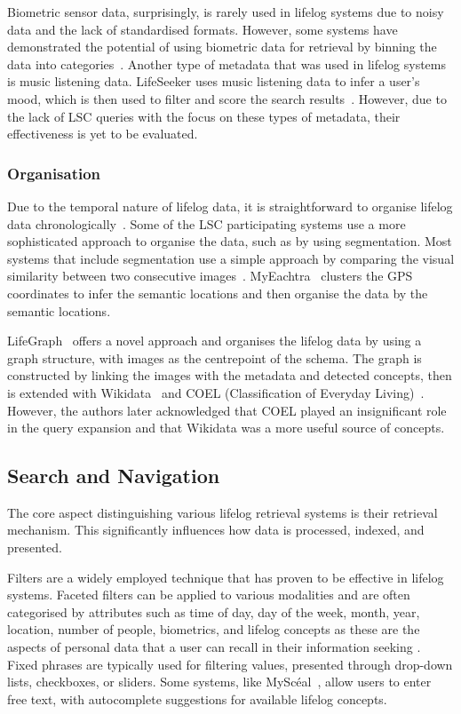 \documentclass[11pt]{article}
\newcommand{\mysceal}{MySc{\'e}al}
\begin{document}
Biometric sensor data, surprisingly, is rarely used in lifelog systems due to noisy data and the lack of standardised formats. However, some systems have demonstrated the potential of using biometric data for retrieval by binning the data into categories~\cite{tran_lifelog_2018,alsina2018interactive,nguyen2019two}. Another type of metadata that was used in lifelog systems is music listening data. LifeSeeker uses music listening data to infer a user's mood, which is then used to filter and score the search results~\cite{nguyen2023lifeseeker}. However, due to the lack of LSC queries with the focus on these types of metadata, their effectiveness is yet to be evaluated.

\subsubsection{Organisation}
Due to the temporal nature of lifelog data, it is straightforward to organise lifelog data chronologically~\cite{zhou_baseline_2017}. Some of the LSC participating systems use a more sophisticated approach to organise the data, such as by using segmentation. Most systems that include segmentation use a simple approach by comparing the visual similarity between two consecutive images~\cite{emysceal2022}. MyEachtra~\cite{tran2023myeachtra} clusters the GPS coordinates to infer the semantic locations and then organise the data by the semantic locations.

LifeGraph~\cite{rossetto2023multi} offers a novel approach and organises the lifelog data by using a graph structure, with images as the centrepoint of the schema. The graph is constructed by linking the images with the metadata and detected concepts, then is extended with Wikidata~\cite{vrandevcic2014wikidata} and COEL (Classification of Everyday Living)~\cite{bruton2019classification}. However, the authors later acknowledged that COEL played an insignificant role in the query expansion and that Wikidata was a more useful source of concepts.

\subsection{Search and Navigation}
The core aspect distinguishing various lifelog retrieval systems is their retrieval mechanism. This  significantly influences how data is processed, indexed, and presented. 

Filters are a widely employed technique that has proven to be effective in lifelog systems. Faceted filters can be applied to various modalities and are often categorised by attributes such as time of day, day of the week, month, year, location, number of people, biometrics, and lifelog concepts as these are the aspects of personal data that a user can  recall in their information seeking \cite{10.1145/3025453.3025838}. Fixed phrases are typically used for filtering values, presented through drop-down lists, checkboxes, or sliders. Some systems, like \mysceal~\cite{emysceal2022}, allow users to enter free text, with autocomplete suggestions for available lifelog concepts. 
\end{document}

